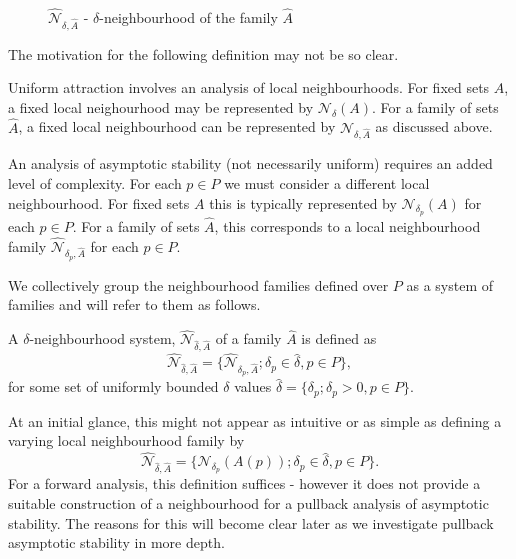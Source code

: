 \begin{figure}[htb]
\begin{center}
\leavevmode
\hbox{
\epsfxsize=6.2cm
  }%
\protect\caption{$\hat{\mathcal{N}}_{\delta,\hat{A}}$
               - $\delta$-neighbourhood of the family $\hat{A}$}
        \protect\label{dnhoodpic}
\end{center}
\end{figure}

The motivation for the following definition may not be so clear.

Uniform attraction involves an analysis of local neighbourhoods. For fixed sets $A$, a fixed local neighourhood may be represented by $\mathcal{N}_{\delta}(A)$. For a family of sets $\hat{A}$, a fixed local neighbourhood can be represented by $\hat{\mathcal{N}}_{\delta,\hat{A}}$ as discussed above.

An analysis of asymptotic stability (not necessarily uniform) requires an added level of complexity. For each $p \in P$ we must consider a different local neighbourhood.
For fixed sets $A$ this is typically represented by $\mathcal{N}_{\delta_p}(A)$ for each $p \in P$. For a family of sets $\hat{A}$, this corresponds to a local neighbourhood family $\hat{\mathcal{N}}_{\delta_p, \hat{A}}$ for each $p \in P$.

We collectively group the neighbourhood families defined over $P$ as a system of families and will refer to them as follows.

\begin{notn}
A $\delta$-neighbourhood system, $\hat{\mathcal{N}}_{\hat{\delta},\hat{A}}$
of a family $\hat{A}$ is defined as
\[ \hat{\mathcal{N}}_{\hat{\delta},\hat{A}}= \{
       \hat{\mathcal{N}}_{\delta_p, \hat{A}} ; \delta_p \in
       \hat{\delta}, p \in P \}, \]
for some set of uniformly bounded $\delta$ values $\hat{\delta} = \{\delta_p
;\delta_p>0, p \in P \}$.
\end{notn}

At an initial glance, this might not appear as intuitive or as simple as defining a varying local neighbourhood family by 
\[ \hat{\mathcal{N}}_{\hat{\delta},\hat{A}}= \{
       \mathcal{N}_{\delta_p}(A(p)) ; \delta_p \in
       \hat{\delta}, p \in P \}. \]
For a forward analysis, this definition suffices - however it does not provide a suitable construction of a neighbourhood for a pullback analysis of asymptotic stability. The reasons for this will become clear later as we investigate pullback asymptotic stability in more depth.

